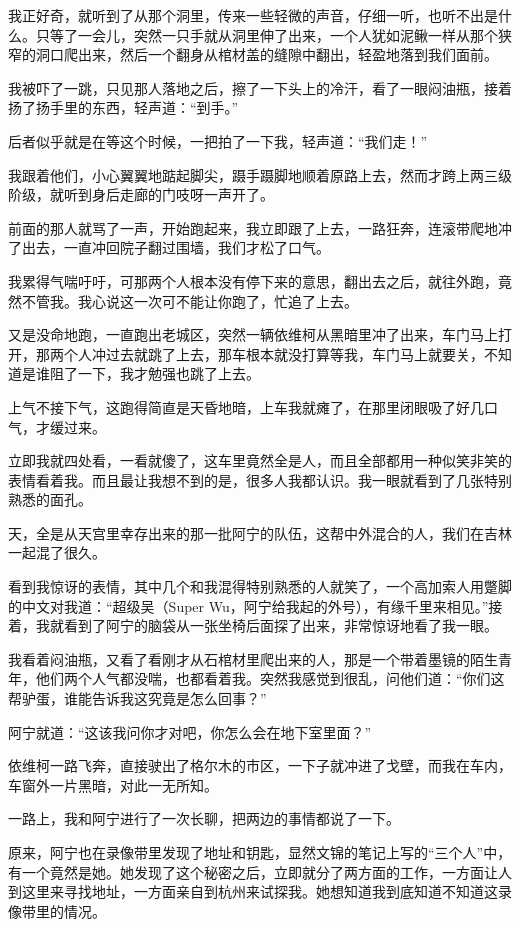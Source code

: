 我正好奇，就听到了从那个洞里，传来一些轻微的声音，仔细一听，也听不出是什么。只等了一会儿，突然一只手就从洞里伸了出来，一个人犹如泥鳅一样从那个狭窄的洞口爬出来，然后一个翻身从棺材盖的缝隙中翻出，轻盈地落到我们面前。

我被吓了一跳，只见那人落地之后，擦了一下头上的冷汗，看了一眼闷油瓶，接着扬了扬手里的东西，轻声道：“到手。”

后者似乎就是在等这个时候，一把拍了一下我，轻声道：“我们走！”

我跟着他们，小心翼翼地踮起脚尖，蹑手蹑脚地顺着原路上去，然而才跨上两三级阶级，就听到身后走廊的门吱呀一声开了。

前面的那人就骂了一声，开始跑起来，我立即跟了上去，一路狂奔，连滚带爬地冲了出去，一直冲回院子翻过围墙，我们才松了口气。

我累得气喘吁吁，可那两个人根本没有停下来的意思，翻出去之后，就往外跑，竟然不管我。我心说这一次可不能让你跑了，忙追了上去。

又是没命地跑，一直跑出老城区，突然一辆依维柯从黑暗里冲了出来，车门马上打开，那两个人冲过去就跳了上去，那车根本就没打算等我，车门马上就要关，不知道是谁阻了一下，我才勉强也跳了上去。

上气不接下气，这跑得简直是天昏地暗，上车我就瘫了，在那里闭眼吸了好几口气，才缓过来。

立即我就四处看，一看就傻了，这车里竟然全是人，而且全部都用一种似笑非笑的表情看着我。而且最让我想不到的是，很多人我都认识。我一眼就看到了几张特别熟悉的面孔。

天，全是从天宫里幸存出来的那一批阿宁的队伍，这帮中外混合的人，我们在吉林一起混了很久。

看到我惊讶的表情，其中几个和我混得特别熟悉的人就笑了，一个高加索人用蹩脚的中文对我道：“超级吴（Super Wu，阿宁给我起的外号），有缘千里来相见。”接着，我就看到了阿宁的脑袋从一张坐椅后面探了出来，非常惊讶地看了我一眼。

我看着闷油瓶，又看了看刚才从石棺材里爬出来的人，那是一个带着墨镜的陌生青年，他们两个人气都没喘，也都看着我。突然我感觉到很乱，问他们道：“你们这帮驴蛋，谁能告诉我这究竟是怎么回事？”

阿宁就道：“这该我问你才对吧，你怎么会在地下室里面？”

依维柯一路飞奔，直接驶出了格尔木的市区，一下子就冲进了戈壁，而我在车内，车窗外一片黑暗，对此一无所知。

一路上，我和阿宁进行了一次长聊，把两边的事情都说了一下。

原来，阿宁也在录像带里发现了地址和钥匙，显然文锦的笔记上写的“三个人”中，有一个竟然是她。她发现了这个秘密之后，立即就分了两方面的工作，一方面让人到这里来寻找地址，一方面亲自到杭州来试探我。她想知道我到底知道不知道这录像带里的情况。


